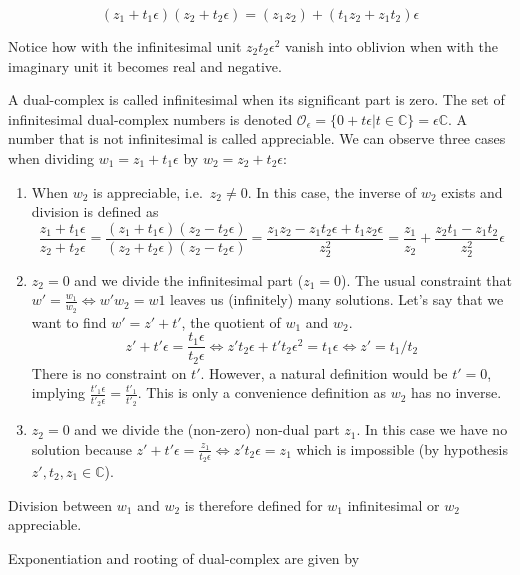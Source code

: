 \documentclass{article}
\newcommand{\C}{\mathbb{C}}
\newcommand{\Z}{\mathcal{O}_\e}
\newcommand{\e}{\epsilon}
\begin{document}
\noindent \begin{equation}
(z_1 + t_1 \e) (z_2 + t_2 \e) = (z_1 z_2) + (t_1 z_2 + z_1 t_2) \e
\end{equation}

Notice how with the infinitesimal unit $z_2 t_2 \e^2$ vanish into oblivion when with the imaginary unit it becomes real and negative.

A dual-complex is called infinitesimal when its significant part is zero. The set of infinitesimal dual-complex numbers is denoted $\Z = \{0 + t \e | t \in \C\} = \e \C$. A number that is not infinitesimal is called appreciable. We can observe three cases when dividing $w_1 = z_1 + t_1 \e$ by $w_2 = z_2 + t_2 \e$:

\begin{enumerate}
        \item When $w_2$ is appreciable, i.e.\ $z_2 \neq 0$. In this case, the inverse of $w_2$ exists and division is defined as
        \begin{equation}
        \frac{z_1 + t_1 \e}{z_2 + t_2 \e} = \frac{(z_1 + t_1 \e)(z_2 - t_2 \e)}{(z_2 + t_2 \e)(z_2 - t_2 \e)} = \frac{z_1 z_2 - z_1 t_2 \e + t_1 z_2 \e}{z_2^2} = \frac{z_1}{z_2} + \frac{z_2 t_1 - z_1 t_2 }{z_2^2} \e
        \end{equation}
        \item $z_2 = 0$ and we divide the infinitesimal part ($z_1 = 0$). The usual constraint that $w' = \frac{w_1}{w_2} \iff w'w_2 = w1$ leaves us (infinitely) many solutions. Let's say that we want to find $w' = z' + t'$, the quotient of $w_1$ and $w_2$.
        \begin{equation}
        z' + t' \e = \frac{t_1 \e}{t_2 \e} \iff z' t_2 \e + t' t_2 \e^2 = t_1 \e \iff z' = t_1/t_2
        \end{equation}
        There is no constraint on $t'$. However, a natural definition would be $t' = 0$, implying $\frac{t'_1 \e}{t'_2 \e} = \frac{t'_1}{t'_2}$. This is only a convenience definition as $w_2$ has no inverse.
        \item $z_2 = 0$ and we divide the (non-zero) non-dual part $z_1$. In this case we have no solution because $z' + t'\e = \frac{z_1}{t_2 \e} \iff z' t_2 \e = z_1$ which is impossible (by hypothesis $z', t_2, z_1 \in \C$).
\end{enumerate}

Division between $w_1$ and $w_2$ is therefore defined for $w_1$ infinitesimal or $w_2$ appreciable.

Exponentiation and rooting of dual-complex are given by
\end{document}
